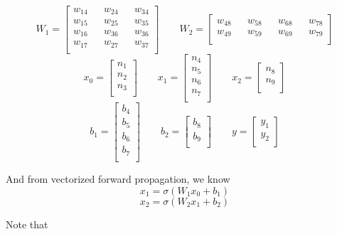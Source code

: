 \documentclass{article}
\begin{document}
\[W_1 =
\begin{bmatrix}
    w_{14} && w_{24} && w_{34} \\
    w_{15} && w_{25} && w_{35} \\
    w_{16} && w_{36} && w_{36} \\
    w_{17} && w_{27} && w_{37} \\
\end{bmatrix}
\qquad
W_2 =
\begin{bmatrix}
    w_{48} && w_{58} && w_{68} && w_{78}\\
    w_{49} && w_{59} && w_{69} && w_{79}\\
\end{bmatrix}
\]
\[x_0 =
\begin{bmatrix}
    n_1 \\
    n_2 \\
    n_3 \\
\end{bmatrix}
\qquad
x_1 =
\begin{bmatrix}
    n_4 \\
    n_5 \\
    n_6 \\
    n_7 \\
\end{bmatrix}
\qquad
x_2 =
\begin{bmatrix}
    n_8 \\
    n_9 \\
\end{bmatrix}
\]
\[
b_1 =
\begin{bmatrix}
    b_4 \\
    b_5 \\
    b_6 \\
    b_7 \\
\end{bmatrix}
\qquad
b_2 =
\begin{bmatrix}
    b_8 \\
    b_9 \\
\end{bmatrix}
\qquad
y =
\begin{bmatrix}
    y_1 \\
    y_2 \\
\end{bmatrix}
\]

And from vectorized forward propagation, we know
\[x_1 = \sigma(W_1x_0 + b_1)\]
\[x_2 = \sigma(W_2x_1 + b_2)\]

Note that
\end{document}
